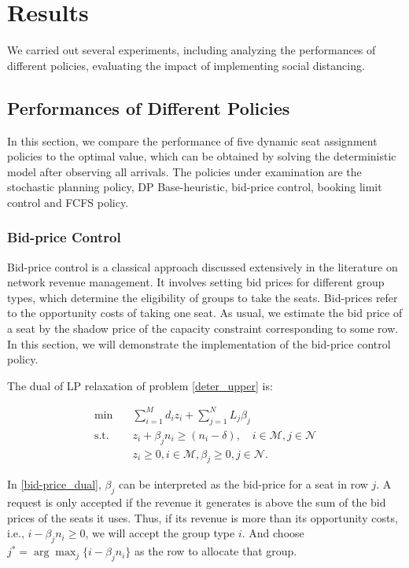 
\section{Results}
We carried out several experiments, including analyzing the performances of different policies, evaluating the impact of implementing social distancing.


\subsection{Performances of Different Policies}
In this section, we compare the performance of five dynamic seat assignment policies to the optimal value, which can be obtained by solving the deterministic model after observing all arrivals. The policies under examination are the stochastic planning policy, DP Base-heuristic, bid-price control, booking limit control and FCFS policy. 


\subsubsection*{Bid-price Control}
Bid-price control is a classical approach discussed extensively in the literature on network revenue management. It involves setting bid prices for different group types, which determine the eligibility of groups to take the seats. Bid-prices refer to the opportunity costs of taking one seat. As usual, we estimate the bid price of a seat by the shadow price of the capacity constraint corresponding to some row. In this section, we will demonstrate the implementation of the bid-price control policy. 

The dual of LP relaxation of problem \eqref{deter_upper} is:

\begin{equation}\label{bid-price_dual}
  \begin{aligned}
  \min \quad & \sum_{i=1}^{M} d_i z_i + \sum_{j= 1}^{N} L_j \beta_{j} \\
  \text {s.t.} \quad & z_{i} + \beta_j n_i \geq (n_i-\delta), \quad i \in \mathcal{M}, j \in \mathcal{N} \\
  & z_{i} \geq 0, i \in \mathcal{M}, \beta_{j} \geq 0, j \in \mathcal{N}.
  \end{aligned}
\end{equation}

In \eqref{bid-price_dual}, $\beta_{j}$ can be interpreted as the bid-price for a seat in row $j$. A request is only accepted if the revenue it generates is above the sum of the bid prices of the seats it uses. Thus, if its revenue is more than its opportunity costs, i.e., $i -\beta_{j} n_i \geq 0$, we will accept the group type $i$. And choose $j^{*} = \arg \max_{j} \{i -\beta_{j} n_i\}$ as the row to allocate that group.


